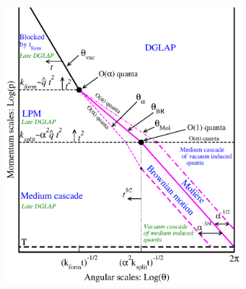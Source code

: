 \begin{figure}[tbp]
\centering
\begin{subfigure}{0.45\textwidth}
\includegraphics[width=0.99\textwidth]{figures/regions4.eps}

\end{subfigure}
\end{figure}
